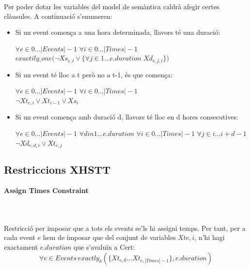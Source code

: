 \documentclass[11pt,a4paper,twoside]{report}
\begin{document}
  Per poder dotar les variables del model de semàntica caldrà afegir certes clàusules. A continuació s'enumeren:
  \begin{itemize}
    \item Si un event comença a una hora determinada, llavors té una duració: \begin{center} $\forall e \in 0 ... |Events|-1$ $\forall i \in 0 ... |Times|-1$ \\$exactily\_one(\neg Xs_{e,i} \vee \{ \forall j \in 1 ... e.duration$ $Xd_{e,j,i}\})$\end{center}
    \item Si un event té lloc a t però no a t-1, és que comença: \begin{center} $\forall e \in 0 ... |Events|-1$ $\forall i \in 0 ... |Times|-1$ \\$\neg Xt_{e,i} \vee Xt_{i-1} \vee Xs_i$ \end{center}
    \item Si un event comença amb duració d, llavors té lloc en d hores consecutives: \begin{center} 
      $\forall e \in 0 ... |Events|-1$ $\forall d in 1 ... e.duration$ $\forall i \in 0 ... |Times|-1$ $\forall j \in i ... i+d-1$ \\
      $\neg Xd_{e,d,i} \vee Xt_{e,j}$
    
    \end{center}
  \end{itemize}

  \subsection{Restriccions XHSTT}
  \paragraph*{Assign Times Constraint} ~\\~\\
  
  Restricció per imposar que a tots els events se'ls hi assigni temps. Per tant, per a cada event $e$ hem de imposar que del conjunt de variables $Xt{e,i}$, n'hi hagi exactament $e.duration$ que s'avaluïn a Cert:
  \[
    \forall e \in Events \ exactly_k(\{Xt_{e,0} ... Xt_{e,|Times|-1}\}, e.duration)
  \]
\end{document}
